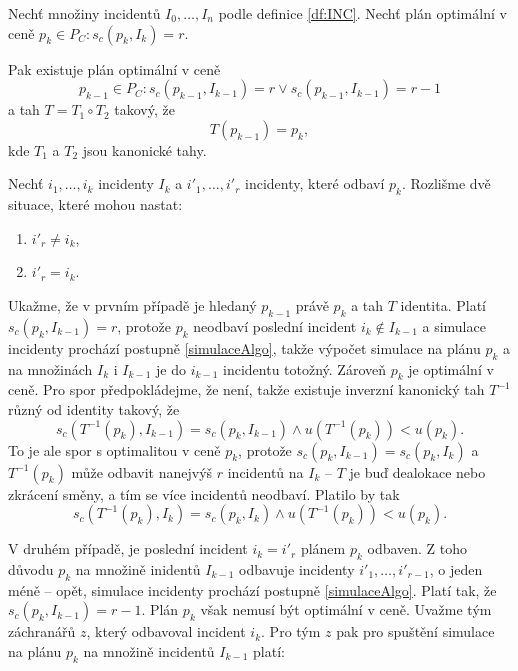 \begin{veta}
  Nechť množiny incidentů $I_0, \dots, I_n$ podle definice \ref{df:INC}.
  Nechť plán optimální v ceně $p_k \in P_C \colon s_c(p_k, I_k) = r$.

  Pak existuje plán optimální v ceně
  \begin{equation*}
    p_{k-1} \in P_C \colon s_c(p_{k-1}, I_{k-1}) = r \lor s_c(p_{k-1}, I_{k-1}) = r - 1
  \end{equation*}
  a tah $T = T_1 \circ T_2$ takový, že
  \begin{equation*}
    T(p_{k-1}) = p_k,
  \end{equation*}
  kde $T_1$ a $T_2$ jsou kanonické tahy.
\end{veta}
\begin{dukaz}
  Nechť $i_1, \dots, i_k$ incidenty $I_k$ a $i'_1, \dots, i'_r$ incidenty, které odbaví $p_k$.
  Rozlišme dvě situace, které mohou nastat:
  \begin{enumerate}
    \item
      $i'_r \neq i_k$,

    \item
      $i'_r = i_k$.
  \end{enumerate}
  Ukažme, že v prvním případě je hledaný $p_{k-1}$ právě $p_k$ a tah $T$ identita.
  Platí $s_c(p_k, I_{k-1}) = r$, protože $p_k$ neodbaví poslední incident $i_k \not \in I_{k-1}$ a simulace incidenty prochází postupně \ref{simulaceAlgo},
  takže výpočet simulace na plánu $p_{k}$ a na množinách $I_k$ i $I_{k-1}$ je do $i_{k-1}$ incidentu totožný.
  Zároveň $p_k$ je optimální v ceně. Pro spor předpokládejme, že není, takže existuje inverzní kanonický tah $T^{-1}$ různý od identity takový,
  že
  \begin{equation*}
    s_c(T^{-1}(p_k), I_{k-1}) = s_c(p_k, I_{k-1}) \land u(T^{-1}(p_k)) < u(p_k).
  \end{equation*}
  To je ale spor s optimalitou v ceně $p_k$, protože $s_c(p_k, I_{k-1}) = s_c(p_k, I_k)$ a $T^{-1}(p_k)$ může odbavit nanejvýš $r$ incidentů na $I_k$ -- $T$ je buď dealokace nebo zkrácení směny,
  a tím se více incidentů neodbaví.
  Platilo by tak
  \begin{equation*}
    s_c(T^{-1}(p_k), I_{k}) = s_c(p_k, I_{k}) \land u(T^{-1}(p_k)) < u(p_k).
  \end{equation*}

  V druhém případě, je poslední incident $i_k = i'_r$ plánem $p_k$ odbaven.
  Z toho důvodu $p_k$ na množině inidentů $I_{k-1}$ odbavuje incidenty $i'_1, \dots, i'_{r-1}$, o jeden méně -- opět, simulace incidenty prochází postupně \ref{simulaceAlgo}.
  Platí tak, že $s_c(p_k, I_{k-1}) = r - 1$. Plán $p_k$ však nemusí být optimální v ceně. Uvažme tým záchranářů $z$, který odbavoval incident $i_k$.
  Pro tým $z$ pak pro spuštění simulace na plánu $p_k$ na množině incidentů $I_{k-1}$ platí:


\end{dukaz}
